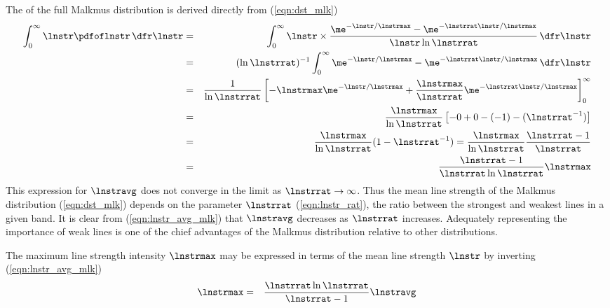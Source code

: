 \documentclass[12pt]{article}
\begin{document}
The  of the full Malkmus distribution
is derived directly from (\ref{eqn:dst_mlk})
\begin{eqnarray}
\int_{0}^{\infty} \lnstr \pdfoflnstr \,\dfr\lnstr 
& = & 
\int_{0}^{\infty} \lnstr \times
\frac{\me^{-\lnstr/\lnstrmax} - \me^{-\lnstrrat \lnstr / \lnstrmax }}
{\lnstr \ln \lnstrrat}
\,\dfr\lnstr \nonumber \\
& = & 
(\ln \lnstrrat)^{-1} 
\int_{0}^{\infty} 
\me^{-\lnstr/\lnstrmax} - \me^{-\lnstrrat \lnstr / \lnstrmax }
\,\dfr\lnstr \nonumber \\
& = & 
\frac{1}{\ln \lnstrrat}
\left[ 
-\lnstrmax \me^{-\lnstr/\lnstrmax} +
\frac{\lnstrmax}{\lnstrrat} \me^{-\lnstrrat \lnstr / \lnstrmax }
\right]_{0}^{\infty} 
\nonumber \\
& = & 
\frac{\lnstrmax}{\ln \lnstrrat}
\left[ -0 + 0 - (-1) - (\lnstrrat^{-1}) \right]
\nonumber \\
& = & 
\frac{\lnstrmax}{\ln \lnstrrat}
( 1 - \lnstrrat^{-1} )
=
\frac{\lnstrmax}{\ln \lnstrrat}
\frac{\lnstrrat - 1}{\lnstrrat}
\nonumber \\
& = & 
\frac{\lnstrrat - 1}{\lnstrrat \ln \lnstrrat} \lnstrmax
\label{eqn:lnstr_avg_mlk}
\end{eqnarray}
This expression for $\lnstravg$ does not converge in the limit as  
$\lnstrrat \rightarrow \infty$. 
Thus the mean line strength of the Malkmus distribution
(\ref{eqn:dst_mlk}) depends on the parameter $\lnstrrat$
(\ref{eqn:lnstr_rat}), the ratio between the strongest and weakest
lines in a given band.
It is clear from (\ref{eqn:lnstr_avg_mlk}) that $\lnstravg$
decreases as $\lnstrrat$ increases.
Adequately representing the importance of weak lines is one 
of the chief advantages of the Malkmus distribution relative to other 
distributions. 

The maximum line strength intensity $\lnstrmax$ may be expressed
in terms of the mean line strength $\lnstr$ by inverting
(\ref{eqn:lnstr_avg_mlk}) 
\begin{eqnarray}
\lnstrmax
& = & 
\frac{\lnstrrat \ln \lnstrrat}{\lnstrrat - 1}\lnstravg
\label{eqn:lnstr_max_mlk}
\end{eqnarray}
\end{document}
